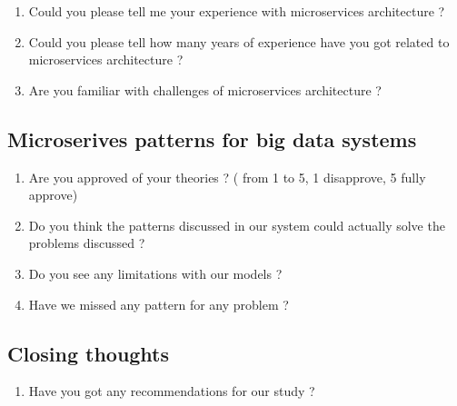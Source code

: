 \documentclass[conference]{IEEEtran}
\begin{document}
\begin{enumerate}
    \item Could you please tell me your experience with microservices architecture ? 
    \item Could you please tell how many years of experience have you got related to microservices architecture ?
    \item Are you familiar with challenges of microservices architecture ?
\end{enumerate}


\subsection{\textbf{Microserives patterns for big data systems}}

\begin{enumerate}
    \item Are you approved of your theories ? ( from 1 to 5, 1 disapprove, 5 fully approve) 
    \item Do you think the patterns discussed in our system could actually solve the problems discussed ? 
    \item Do you see any limitations with our models ? 
    \item Have we missed any pattern for any problem ?
\end{enumerate}

\subsection{\textbf{Closing thoughts}}

\begin{enumerate}
    \item Have you got any recommendations for our study ?
\end{enumerate}
\end{document}
